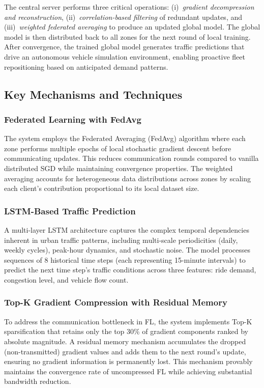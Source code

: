 \documentclass[journal]{IEEEtran}
\begin{document}
The central server performs three critical operations: (i)~\textit{gradient decompression and reconstruction}, (ii)~\textit{correlation-based filtering} of redundant updates, and (iii)~\textit{weighted federated averaging} to produce an updated global model. The global model is then distributed back to all zones for the next round of local training. After convergence, the trained global model generates traffic predictions that drive an autonomous vehicle simulation environment, enabling proactive fleet repositioning based on anticipated demand patterns.

\subsection{Key Mechanisms and Techniques}

\subsubsection{Federated Learning with FedAvg}
The system employs the Federated Averaging (FedAvg) algorithm where each zone performs multiple epochs of local stochastic gradient descent before communicating updates. This reduces communication rounds compared to vanilla distributed SGD while maintaining convergence properties. The weighted averaging accounts for heterogeneous data distributions across zones by scaling each client's contribution proportional to its local dataset size.

\subsubsection{LSTM-Based Traffic Prediction}
A multi-layer LSTM architecture captures the complex temporal dependencies inherent in urban traffic patterns, including multi-scale periodicities (daily, weekly cycles), peak-hour dynamics, and stochastic noise. The model processes sequences of 8 historical time steps (each representing 15-minute intervals) to predict the next time step's traffic conditions across three features: ride demand, congestion level, and vehicle flow count.

\subsubsection{Top-K Gradient Compression with Residual Memory}
To address the communication bottleneck in FL, the system implements Top-K sparsification that retains only the top 30\% of gradient components ranked by absolute magnitude. A residual memory mechanism accumulates the dropped (non-transmitted) gradient values and adds them to the next round's update, ensuring no gradient information is permanently lost. This mechanism provably maintains the convergence rate of uncompressed FL while achieving substantial bandwidth reduction.
\end{document}
